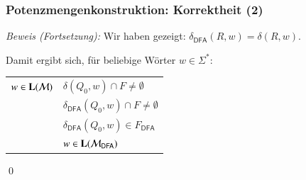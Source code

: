 \documentclass[aspectratio=1610,onlymath]{beamer}
\begin{document}
\begin{frame}[t]\frametitle{Potenzmengenkonstruktion: Korrektheit (2)}


\emph{Beweis (Fortsetzung):} Wir haben gezeigt: $\delta_{\textsf{DFA}}(R,w) = \delta(R,w)$.\pause
\medskip

Damit ergibt sich, für beliebige Wörter $w\in\Sigma^*$:\medskip

\begin{tabular}{l@{~~~ gdw. ~~~}l}
$w\in \textbf{\textcolor{black}{L}}(\mathcal{M})$ & \pause$\delta(Q_0,w)\cap F \neq \emptyset$ \\\pause
	& $\delta_{\textsf{DFA}}(Q_0,w)\cap F \neq \emptyset$ \\\pause
	& $\delta_{\textsf{DFA}}(Q_0,w)\in F_{\textsf{DFA}}$ \\\pause
	& $w\in \textbf{\textcolor{black}{L}}(\mathcal{M}_{\textsf{DFA}})$
\end{tabular}

\qed

\end{frame}
\end{document}
